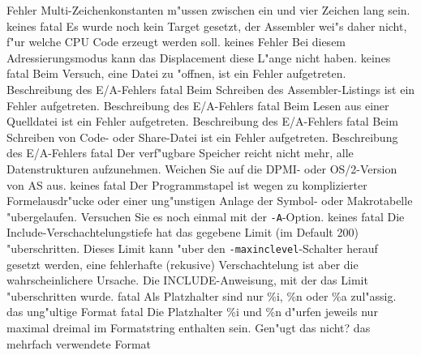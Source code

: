 \documentclass[12pt,a4paper,twoside]{report}
\newcommand{\tty}[1]{{\tt #1}}
\newcommand{\asname}{AS}
\begin{document}
\begin{description}
               {Fehler}
               {Multi-Zeichenkonstanten m"ussen zwischen ein und vier Zeichen lang sein.}
               {keines}
               {fatal}
               {Es wurde noch kein Target gesetzt, der Assembler wei"s daher
                nicht, f"ur welche CPU Code erzeugt werden soll.}
               {keines}
               {Fehler}
               {Bei diesem Adressierungsmodus kann das Displacement diese
                L"ange nicht haben.}
               {keines}
               {fatal}
               {Beim Versuch, eine Datei zu "offnen, ist ein
                Fehler aufgetreten.}
               {Beschreibung des E/A-Fehlers}
               {fatal}
               {Beim Schreiben des Assembler-Listings ist ein
                Fehler aufgetreten.}
               {Beschreibung des E/A-Fehlers}
               {fatal}
               {Beim Lesen aus einer Quelldatei ist ein
                Fehler aufgetreten.}
               {Beschreibung des E/A-Fehlers}
               {fatal}
               {Beim Schreiben von Code- oder Share-Datei
                ist ein Fehler aufgetreten.}
               {Beschreibung des E/A-Fehlers}
               {fatal}
               {Der verf"ugbare Speicher reicht nicht mehr,
	        alle Datenstrukturen aufzunehmen.  Weichen Sie auf die
	        DPMI- oder OS/2-Version von \asname{} aus.}
               {keines}
               {fatal}
               {Der Programmstapel ist wegen zu komplizierter
	        Formelausdr"ucke oder einer ung"unstigen Anlage der Symbol-
	        oder Makrotabelle "ubergelaufen.  Versuchen Sie es noch
	        einmal mit der \tty{-A}-Option.}
               {keines}
               {fatal}
               {Die Include-Verschachtelungstiefe hat das gegebene Limit
                (im Default 200) "uberschritten.  Dieses Limit kann "uber
                den {\tt -maxinclevel}-Schalter herauf gesetzt werden, eine
                fehlerhafte (rekusive) Verschachtelung ist aber die
                wahrscheinlichere Ursache.}
               {Die INCLUDE-Anweisung, mit der das Limit "uberschritten wurde.}
               {fatal}
               {Als Platzhalter sind nur \%i, \%n oder \%a zul"assig.}
               {das ung"ultige Format}
               {fatal}
               {Die Platzhalter \%i und \%n d"urfen jeweils nur maximal dreimal
                im Formatstring enthalten sein.  Gen"ugt das nicht?}
               {das mehrfach verwendete Format}
\end{description}
\end{document}
